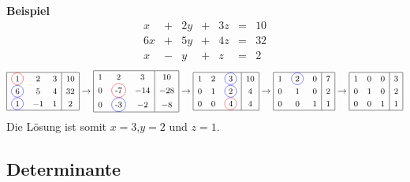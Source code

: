 \textbf{Beispiel}
\begin{equation*}
	\begin{array}{rcrcrcr}
		 x &+& 2y &+& 3z &=& 10\\
		6x &+& 5y &+& 4z &=& 32\\
		 x &-&  y &+&  z &=& 2
	\end{array}
\end{equation*}
\begin{equation*}
\small
\renewcommand{\arraystretch}{1.25}
	\begin{array}{|ccc|c|}
		\hline
		\circledr{1}  &  2 & 3  & 10\\
		\circledb{6}  &  5 & 4  & 32\\
		\circledb{1}  & -1 & 1  & 2 \\
		\hline
	\end{array}
	\rightarrow
	\begin{array}{|ccc|c|}
		\hline
		1  & 2             & 3   & 10 \\
		0  & \circledr{-7} & -14 & -28\\
		0  & \circledb{-3} & -2  & -8 \\
		\hline
	\end{array}
	\rightarrow
	\begin{array}{|ccc|c|}
		\hline
		1  & 2  & \circledb{3} & 10\\
		0  & 1  & \circledb{2} & 4 \\
		0  & 0  & \circledr{4} & 4 \\
		\hline
	\end{array}
	\rightarrow
	\begin{array}{|ccc|c|}
		\hline
		1 & \circledb{2} & 0 & 7\\
		0 & 1            & 0 & 2 \\
		0 & 0            & 1 & 1 \\
		\hline
	\end{array}
	\rightarrow
	\begin{array}{|ccc|c|}
		\hline
		1 & 0 & 0 & 3\\
		0 & 1 & 0 & 2 \\
		0 & 0 & 1 & 1 \\
		\hline
	\end{array}
\end{equation*}
Die Lösung ist somit $x = 3 $,$ y = 2 $ und $ z = 1$.
\subsection{Determinante}

